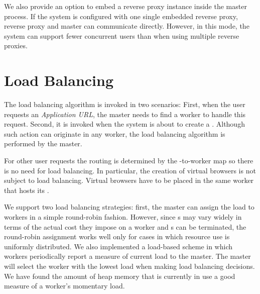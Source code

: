 We also provide an option to embed a reverse proxy instance inside the master process.
If the system is configured with one single embedded reverse proxy,
reverse proxy and master can communicate directly.
However, in this mode, the system can support fewer concurrent users than 
when using multiple reverse proxies.

\section{Load Balancing}
\label{sec:lb}

The load balancing algorithm is invoked in two scenarios:
First, when the user requests an \emph{Application URL},
the master needs to find a worker to handle this request.
Second, it is invoked when the system is about to create a \appins{}.
Although such action can originate in any worker,
the load balancing algorithm is performed by the master.

For other user requests the routing is determined by the \appins{}-to-worker map
so there is no need for load balancing.
In particular, the creation of virtual browsers is not subject to load balancing.
Virtual browsers have to be placed in the same worker that hosts its \appins{}.

We support two load balancing strategies: first, the master can assign the
load to workers in a simple round-robin fashion. However, since \appins{}s may
vary widely in terms of the actual cost they impose on a worker and \appins{}s
can be terminated, the round-robin assignment works well only for cases in 
which resource use is uniformly distributed.
We also implemented a load-based scheme in which
workers periodically report a measure of current load to the master. The
master will select the worker with the lowest load when making load balancing decisions.
We have found the amount of heap memory that is currently in use a good measure
of a worker's momentary load.

